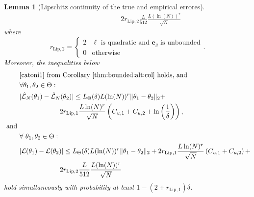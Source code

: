\documentclass{article}
\newtheorem{lemma}[theorem]{Lemma}
\newcommand{\e}{\mathbf{e}}
\begin{document}
\begin{lemma}[Lipschitz continuity of the true and empirical errores]
\begin{equation}
\begin{aligned}
           & \qquad\qquad\qquad 2r_{\text{Lip},2}  \frac{L}{512} \frac{L(\ln(N))^r}{\sqrt{N}}
   \end{aligned}
   \end{equation}
    where $$ r_{\text{Lip},2}=\left\{\begin{array}{ll} 2 & \ell \mbox{ is quadratic and $\e_g$ is unbounded} \\ 0 & \mbox{otherwise} \end{array}\right. .$$
   Moreover, the inequalities below 
   \begin{equation}
   \label{pac:lipschitz:loss:eq3}
   \begin{aligned}
     & \mbox{\eqref{catoni1} from Corollary \ref{thm:bounded:alt:col} holds, and }  \\
     & \forall \theta_1,\theta_2 \in \Theta: \\
         & |\hat{\mathcal{L}}_N(\theta_1) - \hat{\mathcal{L}}_N(\theta_2)| \le L_{\Theta}(\delta) L(\ln(N))^r \|\theta_1 - \theta_2\|_2
           +  \\
            & \qquad\qquad\qquad 2r_{\text{Lip},1}\frac{L\ln(N)^{r}}{\sqrt{N}}\left(C_{u,1} + C_{u,2}+\ln\left(\frac{1}{\delta}\right)\right), \\
           \text{ and } &\\
       & \forall ~ \theta_1,\theta_2 \in \Theta: \quad \\
          & |\mathcal{L}(\theta_1) - \mathcal{L}(\theta_2)| \le L_{\Theta}(\delta) L(\ln(N))^r \|\theta_1 - \theta_2\|_2
          + 2r_{\text{Lip},1}\frac{L\ln(N)^{r}}{\sqrt{N}}\left(C_{u,1} + C_{u,2}\right) + \\
           & \qquad\qquad\qquad 2r_{\text{Lip},2}  \frac{L}{512} \frac{L(\ln(N))^r}{\sqrt{N}}
   \end{aligned}
   \end{equation}
   hold simultaneously  with probability at least $1-(2+r_{\text{Lip},1})\delta$.
  
\end{lemma}
\end{document}
